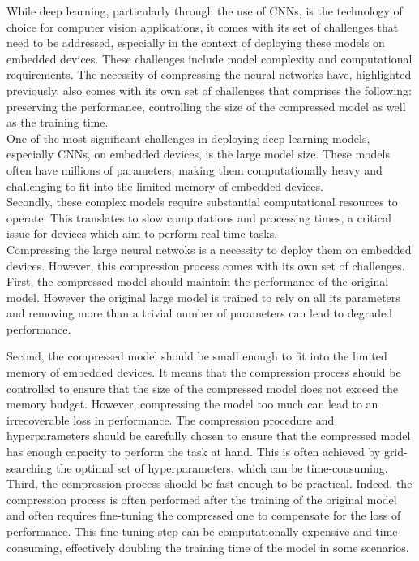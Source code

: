 While deep learning, particularly through the use of \acp{CNN}, is the
technology of choice for computer vision applications, it comes with its set of
challenges that need to be addressed, especially in the context of deploying
these models on embedded devices. These challenges include model complexity and
computational requirements. The necessity of compressing the neural networks
have, highlighted previously, also comes with its own set of challenges that
comprises the following: preserving the performance,  controlling the size of
the compressed model as well as the training time.\\

One of the most significant challenges in deploying deep learning models,
especially \acp{CNN}, on embedded devices, is the large model size. These models
often have millions of parameters, making them computationally heavy and
challenging to fit into the limited memory of embedded devices.\\

Secondly, these complex models require substantial computational resources to
operate. This translates to slow computations and processing times, a critical
issue for devices which aim to perform real-time tasks.\\

Compressing the large neural netwoks is a necessity to deploy them on embedded
devices. However, this compression process comes with its own set of challenges.
First, the compressed model should maintain the performance of the original
model. However the original large model is trained to rely on all its parameters
and removing more than a trivial number of parameters can lead to degraded
performance.

Second, the compressed model should be small enough to fit into the limited
memory of embedded devices. It means that the compression process should be
controlled to ensure that the size of the compressed model does not exceed the
memory budget. However, compressing the model too much can lead to an
irrecoverable loss in performance. The compression procedure and hyperparameters
should be carefully chosen to ensure that the compressed model has enough
capacity to perform the task at hand. This is often achieved by grid-searching
the optimal set of hyperparameters, which can be time-consuming.\\

Third, the compression process should be fast enough to be practical. Indeed,
the compression process is often performed after the training of the original
model and often requires fine-tuning the compressed one to compensate for the
loss of performance. This fine-tuning step can be computationally expensive and
time-consuming, effectively doubling the training time of the model in some
scenarios.\\

